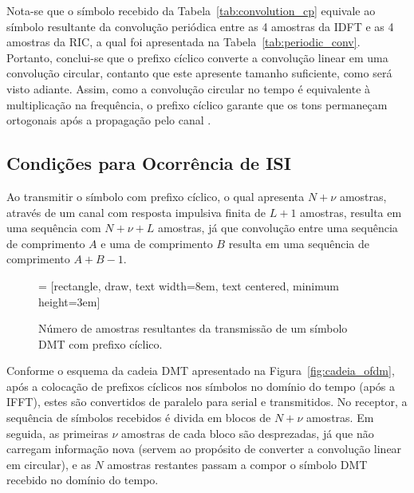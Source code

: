 Nota-se que o símbolo recebido da Tabela~\ref{tab:convolution_cp} equivale ao símbolo resultante da convolução periódica entre as 4 amostras da IDFT e as 4 amostras da RIC, a qual foi apresentada na Tabela~\ref{tab:periodic_conv}. Portanto, conclui-se que o prefixo cíclico converte a convolução linear em uma convolução circular, contanto que este apresente tamanho suficiente, como será visto adiante. Assim, como a convolução circular no tempo é equivalente à multiplicação na frequência, o prefixo cíclico garante que os tons permaneçam ortogonais após a propagação pelo canal \cite{cendrillonthesis}.

\subsection{Condições para Ocorrência de ISI}
\label{eq:cond_isi}

Ao transmitir o símbolo com prefixo cíclico, o qual apresenta $N + \nu$ amostras, através de um canal com resposta impulsiva finita de $L + 1$ amostras, resulta em uma sequência com $N + \nu + L $ amostras, já que convolução entre uma sequência de comprimento $A$ e uma de comprimento $B$ resulta em uma sequência de comprimento $A + B -1$.  \\

\begin{figure}[htbp]
\centering
 = [rectangle, draw, text width=8em, text centered, minimum height=3em]
\caption{Número de amostras resultantes da transmissão de um símbolo DMT com prefixo cíclico.}
\label{fig:transmission}
\end{figure}

Conforme o esquema da cadeia DMT apresentado na Figura~\ref{fig:cadeia_ofdm}, após a colocação de prefixos cíclicos nos símbolos no domínio do tempo (após a IFFT), estes são convertidos de paralelo para serial e transmitidos. No receptor, a sequência de símbolos recebidos é divida em blocos de $N+\nu$ amostras. Em seguida, as primeiras $\nu$ amostras de cada bloco são desprezadas, já que não carregam informação nova (servem ao propósito de converter a convolução linear em circular), e as $N$ amostras restantes passam a compor o símbolo DMT recebido no domínio do tempo.

